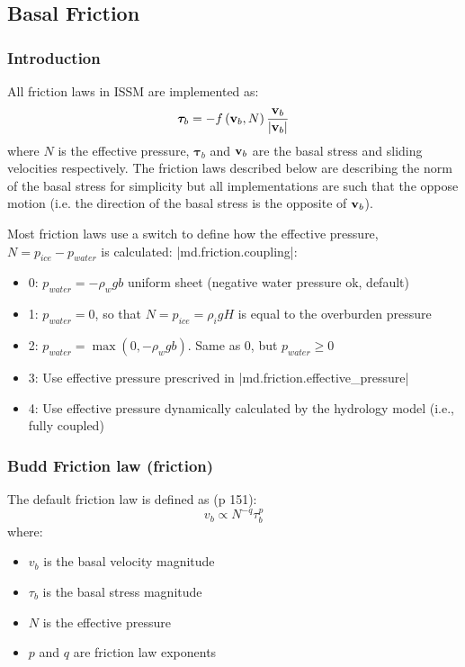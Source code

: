 
\subsection{Basal Friction} \label{sec:using-issm-parameterization-friction}
\subsubsection{Introduction}
All friction laws in ISSM are implemented as:
\begin{equation}
	\boldsymbol{\tau}_b = -f\left({\bf v}_b,N\right) \frac{ {\bf v}_b}{\left|{\bf v}_b\right|}
\end{equation}
where $N$ is the effective pressure, $\boldsymbol{\tau}_b$ and ${\bf v}_b$ are the basal stress and
sliding velocities respectively. The friction laws described below are describing the norm of the
basal stress for simplicity but all implementations are such that the oppose motion (i.e. the
direction of the basal stress is the opposite of ${\bf v}_b$).

Most friction laws use a switch to define how the effective pressure, $N = p_{ice} - p_{water}$ is
calculated: \lstinlinebg|md.friction.coupling|:
\begin{itemize}
	\item 0: $p_{water} = -\rho_w g b$  uniform sheet (negative water pressure ok, default)
	\item 1: $p_{water} = 0$, so that $N=p_{ice}=\rho_i g H$ is equal to the overburden pressure
	\item 2: $p_{water} = \max\left(0,-\rho_w g b\right)$. Same as 0, but $p_{water}\ge 0$
	\item 3: Use effective pressure prescrived in \lstinlinebg|md.friction.effective_pressure|
	\item 4: Use effective pressure dynamically calculated by the hydrology model (i.e., fully
		coupled)
\end{itemize}

\subsubsection{Budd Friction law (friction)}
The default friction law is defined as \citep{Paterson1994} (p 151):
\begin{equation}
	v_b \propto N^{-q} {\tau}_b^p
\end{equation}
where:
\begin{itemize}
	\item $v_b$ is the basal velocity magnitude
	\item $\tau_b$ is the basal stress magnitude
	\item $N$ is the effective pressure
	\item $p$ and $q$ are friction law exponents
\end{itemize}

